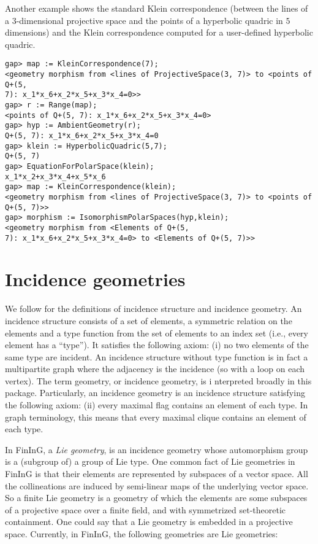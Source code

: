 \documentclass{article}
\def\fining{{\sf FinInG}}
\begin{document}
Another example shows the standard Klein correspondence (between the lines of a $3$-dimensional projective space and the points of a hyperbolic quadric in $5$ dimensions) and the Klein correspondence computed for a user-defined hyperbolic quadric.

\begin{verbatim}
gap> map := KleinCorrespondence(7);
<geometry morphism from <lines of ProjectiveSpace(3, 7)> to <points of Q+(5, 
7): x_1*x_6+x_2*x_5+x_3*x_4=0>>
gap> r := Range(map);
<points of Q+(5, 7): x_1*x_6+x_2*x_5+x_3*x_4=0>
gap> hyp := AmbientGeometry(r);
Q+(5, 7): x_1*x_6+x_2*x_5+x_3*x_4=0
gap> klein := HyperbolicQuadric(5,7);
Q+(5, 7)
gap> EquationForPolarSpace(klein);
x_1*x_2+x_3*x_4+x_5*x_6
gap> map := KleinCorrespondence(klein);
<geometry morphism from <lines of ProjectiveSpace(3, 7)> to <points of Q+(5, 7)>>
gap> morphism := IsomorphismPolarSpaces(hyp,klein);
<geometry morphism from <Elements of Q+(5, 
7): x_1*x_6+x_2*x_5+x_3*x_4=0> to <Elements of Q+(5, 7)>>
\end{verbatim}

\section{Incidence geometries}

We follow \cite{BC13} for the definitions of incidence structure and incidence geometry. An incidence structure 
consists of a set of elements, a symmetric relation on the elements and a type function from the set of 
elements to an index set (i.e., every element has a ``type''). It satisfies the following axiom: (i) no two elements 
of the same type are incident. An incidence structure without type function is in fact a multipartite graph where 
the adjacency is the incidence (so with a loop on each vertex). The term geometry, or incidence geometry, is i
nterpreted broadly in this package. Particularly, an incidence geometry is an incidence structure satisfying the 
following axiom: (ii) every maximal flag contains an element of each type. In graph terminology, this means that 
every maximal clique contains an element of each type.

In \fining{}, a {\em Lie geometry}, is an incidence geometry whose automorphism group is a (subgroup of) a group
of Lie type. One common fact of Lie geometries in \fining{} is that their elements are represented by subspaces of a 
vector space. All the collineations are induced by semi-linear 
maps of the underlying vector space. So a finite Lie geometry is a geometry of which the elements are some subspaces 
of a projective space over a finite field, and with symmetrized set-theoretic containment. One could say that a Lie geometry
is embedded in a projective space. Currently, in \fining{}, the following geometries are Lie geometries:
\end{document}
